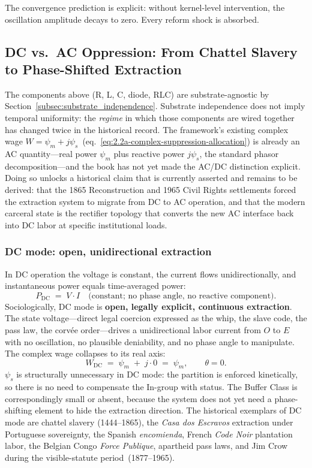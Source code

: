 The convergence prediction is explicit: without kernel-level intervention, the
oscillation amplitude decays to zero. Every reform shock is absorbed.

\subsection{DC vs.\ AC Oppression: From Chattel Slavery to Phase-Shifted Extraction}
\label{subsec:dc_vs_ac}

The components above (R, L, C, diode, RLC) are substrate-agnostic by
Section~\ref{subsec:substrate_independence}. Substrate independence does not imply temporal uniformity: the \emph{regime} in which those components are wired together has changed twice in the historical record. The framework's existing complex wage
$W = \psi_m + j\psi_s$~(eq.~\ref{eq:2.2a-complex-suppression-allocation})
is already an AC quantity---real power $\psi_m$ plus reactive power
$j\psi_s$, the standard phasor decomposition---and the book has not yet
made the AC/DC distinction explicit. Doing so unlocks a historical claim
that is currently asserted and remains to be derived: that the 1865 Reconstruction
and 1965 Civil Rights settlements forced the extraction system to
migrate from DC to AC operation, and that the modern carceral state is
the rectifier topology that converts the new AC interface back into DC
labor at specific institutional loads.

\subsubsection*{DC mode: open, unidirectional extraction}

In DC operation the voltage is constant, the current flows
unidirectionally, and instantaneous power equals time-averaged power:
\begin{equation}\label{eq:0.7-dc-power-baseline}
P_{\text{DC}} \;=\; V \cdot I \quad\text{(constant; no phase angle, no reactive component).}
\end{equation}
Sociologically, DC mode is \textbf{open, legally explicit, continuous
extraction}. The state voltage---direct legal coercion expressed as
the whip, the slave code, the pass law, the corv\'{e}e order---drives a
unidirectional labor current from $O$ to $E$ with no oscillation, no
plausible deniability, and no phase angle to manipulate. The complex
wage collapses to its real axis:
\begin{equation}\label{eq:0.7a-dc-wage-collapse}
W_{\text{DC}} \;=\; \psi_m \;+\; j\!\cdot\!0 \;=\; \psi_m, \qquad \theta = 0.
\end{equation}
$\psi_s$ is structurally unnecessary in DC mode: the partition is
enforced kinetically, so there is no need to compensate the In-group
with status. The Buffer Class is correspondingly small or absent,
because the system does not yet need a phase-shifting element to hide
the extraction direction. The historical exemplars of DC mode are
chattel slavery (1444--1865), the \textit{Casa dos Escravos} extraction
under Portuguese sovereignty, the Spanish \textit{encomienda}, French
\textit{Code Noir} plantation labor, the Belgian Congo
\textit{Force Publique}, apartheid pass laws, and Jim Crow during the
visible-statute period~(1877--1965).

